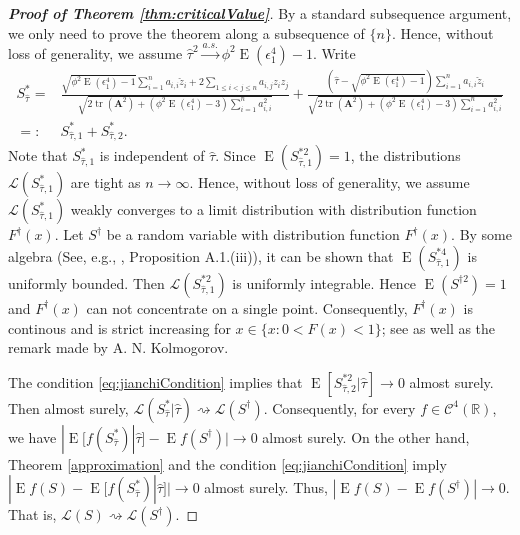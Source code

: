\documentclass[11pt]{article}
\DeclareMathOperator{\mytr}{tr}
\DeclareMathOperator{\myE}{E}
\newcommand{\BA}{\mathbf{A}}    \newcommand{\BB}{\mathbf{B}}    \newcommand{\BC}{\mathbf{C}}    \newcommand{\BD}{\mathbf{D}}    \newcommand{\BE}{\mathbf{E}}    \newcommand{\BF}{\mathbf{F}}    \newcommand{\BG}{\mathbf{G}}    \newcommand{\BH}{\mathbf{H}}    \newcommand{\BI}{\mathbf{I}}    \newcommand{\BJ}{\mathbf{J}}    \newcommand{\BK}{\mathbf{K}}    \newcommand{\BL}{\mathbf{L}}
\theoremstyle{plain}
\theoremstyle{definition}
\theoremstyle{remark}
\begin{document}
\begin{appendices}
\begin{proof}[\textbf{Proof of Theorem \ref{thm:criticalValue}}]
    By a standard subsequence argument, we only need to prove the theorem along a subsequence of $\{n\}$.
    Hence, without loss of generality, we assume $\hat \tau^2 \xrightarrow{a.s.} \phi^2 \myE (\epsilon_1^4)-1$.
    Write
    \begin{equation*}
        \begin{split}
        S_{\hat \tau}^* =&
        \frac{
            \sqrt{\phi^2\myE (\epsilon_1^4)-1} \sum_{i=1}^n  a_{i,i}\check z_i
        +2\sum_{1\leq i <j \leq n} a_{i,j} z_i z_j
    }
    {
            \sqrt{
    2 \mytr(\BA^2)
    +
    (\phi^2\myE (\epsilon_1^4)-3) \sum_{i=1}^n a_{i,i}^2
            }             
        }
        +
        \frac{
                (\hat \tau -
            \sqrt{
                \phi^2\myE (\epsilon_1^4)-1
            }
        )
             \sum_{i=1}^n  a_{i,i}\check z_i
    }
    {
            \sqrt{
    2 \mytr(\BA^2)
    +
    (\phi^2\myE (\epsilon_1^4)-3) \sum_{i=1}^n a_{i,i}^2
            }             
        }
        \\
        =:& S_{\hat \tau,1}^{*} + S_{\hat \tau,2}^{*}
    .
        \end{split}
    \end{equation*}
    Note that $S_{\hat{\tau},1}^*$ is independent of $\hat \tau$.
    Since $\myE ( S_{\hat \tau,1}^{*2} )=1$,  the distributions $\mathcal L(S_{\hat \tau,1}^{*}) $ are tight as $n\to \infty$.
    Hence, without loss of generality, we assume $\mathcal L (S_{\hat \tau,1}^*)$ weakly converges to a limit distribution with distribution function $F^\dagger(x)$.
    Let $S^\dagger$ be a random variable with distribution function $F^\dagger(x)$.
    By some algebra (See, e.g., \cite{chen2010tests}, Proposition A.1.(iii)),
    it can be shown that $\myE (S^{*4}_{\hat \tau,1})$ is uniformly bounded.
    Then $\mathcal L ( S_{\hat \tau,1}^{*2} )$ is  uniformly integrable.
    Hence $\myE(S^{\dagger 2})=1$ and $F^\dagger(x)$ can not concentrate on a single point.
    Consequently, $F^\dagger(x)$ is continous and is strict increasing for $x\in\{x:0<F(x)<1\}$; see \cite{Sevast1961A} as well as the remark made by A. N. Kolmogorov.

    The condition \eqref{eq:jianchiCondition} implies that $\myE[S_{\hat \tau,2}^{*2}|\hat \tau]\to 0$ almost surely.
    Then almost surely, $\mathcal L (S^*_{\hat \tau}|\hat \tau) \rightsquigarrow \mathcal L(S^\dagger)$.
    Consequently, for every $f\in \mathscr C^4 (\mathbb R)$,
    we have $| \myE [f(S^*_{\hat \tau}) |\hat\tau] - \myE f(S^\dagger) |\to 0$ almost surely.
    On the other hand, Theorem \ref{approximation} and the condition \eqref{eq:jianchiCondition} imply
        $|\myE f(S)- \myE [f(S^*_{\hat \tau})|\hat\tau] |\to 0$ almost surely.
        Thus, $|\myE f(S)- \myE f(S^\dagger) |\to 0$.
        That is, $\mathcal L (S)\rightsquigarrow \mathcal L (S^\dagger)$.


\end{proof}
\end{appendices}
\end{document}
